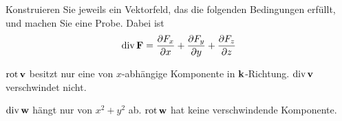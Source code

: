 \begin{atiTask}[
  title = Rotation und Divergenz
]

Konstruieren Sie jeweils ein Vektorfeld, das die folgenden Bedingungen erfüllt, und machen Sie eine Probe. Dabei ist 
\[\divergence \vec{F} = \leibnizPartialDerivative{F_x}{x}+\leibnizPartialDerivative{F_y}{y}+\leibnizPartialDerivative{F_z}{z}\]
\begin{atiSubtasks}
\item $\operatorname{rot} \mathbf{v}$ besitzt nur eine von $x$-abhängige Komponente in $\mathbf{k}$-Richtung. $\operatorname{div} \mathbf{v}$ verschwindet nicht.
\item $\operatorname{div} \mathbf{w}$ hängt nur von $x^2+y^2$ ab. $\operatorname{rot} \mathbf{w}$ hat keine verschwindende Komponente.
\end{atiSubtasks}
\end{atiTask}

\begin{atiSolution}

%
\end{atiSolution}